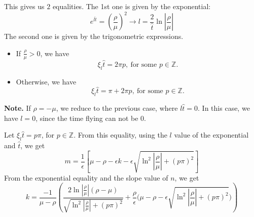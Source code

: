 \documentclass[a4paper,preprint,11pt]{article}
\begin{document}
This gives us $2$ equalities. The 1st one is given by the exponential:
$$
e^{l\hat{t}}=\left(\frac{\rho}{\mu}\right)^2 \rightarrow \boxed{l = \frac{2}{\hat{t}}\ln\left\lvert\frac{\rho}{\mu}\right\rvert}
$$
The second one is given by the trigonometric expressions.
\begin{itemize}
    \item If $\frac{\rho}{\mu}>0$, we have
    $$
    \xi_l\hat{t} = 2\pi p,\ \text{for some }p\in\mathbb{Z}.
    $$
    \item Otherwise, we have
    $$
    \xi_l\hat{t} = \pi + 2\pi p,\ \text{for some }p\in\mathbb{Z}.
    $$
\end{itemize}
\textbf{Note.} If $\rho=-\mu$, we reduce to the previous case, where $l\hat{t}=0$. In this case, we have $l=0$, since the time flying can not be 0.

Let $\xi_l\hat{t} = p\pi$, for $p\in\mathbb{Z}$. From this equality, using the $l$ value of the exponential and $\hat{t}$, we get
\begin{equation} \label{eq:m}
 \boxed{
m = \frac{1}{\epsilon}\left[\mu - \rho - \epsilon k - \epsilon\sqrt{\ln^2\left\lvert\frac{\rho}{\mu}\right\rvert+(p\pi)^2}\right]
}   
\end{equation}
From the exponential equality and the slope value of $n$, we get
\begin{equation} \label{eq:k}
\boxed{
k = \frac{-1}{\mu-\rho}\left(\frac{2\ln\left\lvert\frac{\rho}{\mu}\right\rvert(\rho-\mu)}{\sqrt{\ln^2\left\lvert\frac{\rho}{\mu}\right\rvert+(p\pi)^2}} + \frac{\rho}{\epsilon}\big(\mu-\rho-\epsilon\sqrt{\ln^2\left\lvert\frac{\rho}{\mu}\right\rvert+(p\pi)^2}\big) \right)
}
\end{equation}
\end{document}
